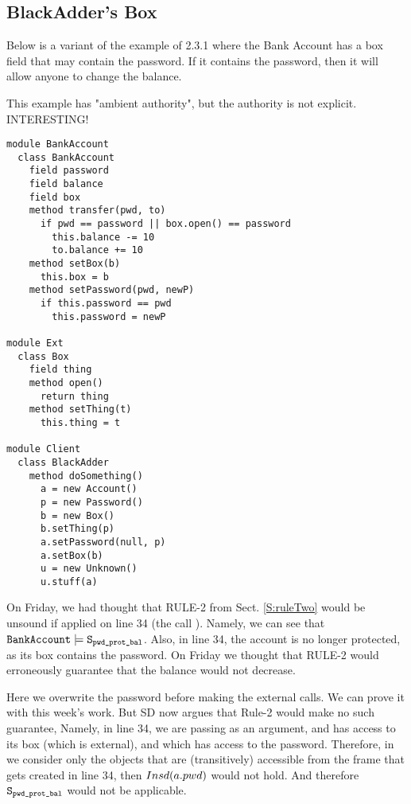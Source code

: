 \subsection{BlackAdder's Box}
\label{s:blackadder_box}

Below is a variant of the example of 2.3.1 where the Bank Account has a box field 
that may contain the password. If it contains the password, then it will allow anyone to change the balance.

This example has "ambient authority", but the authority is not explicit. INTERESTING!

\begin{lstlisting}[language=chainmail, mathescape=true, frame=lines]
module BankAccount
  class BankAccount
    field password
    field balance
    field box
    method transfer(pwd, to)
      if pwd == password || box.open() == password
        this.balance -= 10
        to.balance += 10
    method setBox(b)
      this.box = b
    method setPassword(pwd, newP)
      if this.password == pwd
        this.password = newP
      
module Ext
  class Box
    field thing
    method open()
      return thing
    method setThing(t)
      this.thing = t
    
module Client
  class BlackAdder
    method doSomething()
      a = new Account()
      p = new Password()
      b = new Box()
      b.setThing(p)
      a.setPassword(null, p)
      a.setBox(b)
      u = new Unknown()
      u.stuff(a)   
\end{lstlisting}

On Friday, we had thought that RULE-2 from Sect.  \ref{S:ruleTwo} would be unsound if applied on line 34 (the call ).
Namely, we can see that ${\texttt{BankAccount}} \models {\texttt{S}}_{{\texttt{{pwd\_prot\_bal}}}}$.  
Also, in line 34, the account is no longer protected, as its box contains the password. On Friday we thought that RULE-2 would 
erroneously guarantee that the balance would not decrease.

Here we overwrite the password before making the external calls. 
We can prove it with this week's work.
\SP But SD now argues that Rule-2 would make no such guarantee, Namely, in line 34, we are passing  as an argument, and  has access to its box (which is external), and which has access to the password. 
Therefore, in we consider only the objects that are (transitively) accessible from the frame that gets created 
in line 34, then $Insd(a.pwd)$ would not hold. And therefore ${\texttt{S}}_{{\texttt{{pwd\_prot\_bal}}}}$ would not be applicable. 




